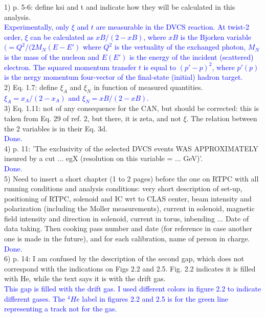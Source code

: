 1) p. 5-6: define ksi and t and indicate how they will be calculated in this 
analysis.\\
   \textcolor{blue}{ Experimentally, only  $\xi$ and $t$ are 
      measurable in the DVCS reaction. At twist-2 order, $\xi$ can be 
      calculated as $xB/(2-xB)$, where $xB$ is the Bjorken variable $(= 
      Q^{2}/(2M_{N}(E-E')$ where $Q^2$ is the vertuality of the exchanged 
      photon, $M_{N}$ is the mass of the nucleon and $E (E')$ is the energy of 
      the incident (scattered) electron. The squared
 momentum transfer $t$  is equal to $(p'- p)^{2}$, where $p' (p)$ is the nergy 
 momentum four-vector of the final-state (initial) hadron target. }\\

2) Eq. 1.7: define $\xi_{A}$ and $\xi_{N}$ in function of measured quantities. \\
\textcolor{blue}{ $ \xi_{A}= x_{A}/(2-x_{A})$ and  $\xi_{N}= xB/(2-xB)$.
}\\

3) Eq. 1.11: not of any consequence for the CAN, but should be corrected:  this 
is taken from Eq. 29 of ref. 2, but there, it is zeta, and not $\xi$. The 
relation between the 2 variables is in their Eq. 3d. \\
\textcolor{blue}{   Done.}\\

4) p. 11: 'The exclusivity of the selected DVCS events WAS APPROXIMATELY 
insured by a cut ... egX (resolution on this variable = ... GeV)'. \\
\textcolor{blue}{Done.}\\


5) Need to insert a short chapter (1 to 2 pages) before the one on RTPC with all 
running conditions and analysis conditions: very short description of set-up, 
positioning of RTPC, solenoid and IC wrt to CLAS center, beam intensity and 
polarization (including the Moller measurements), current in solenoid, magnetic 
field intensity and direction in solenoid, current in torus, inbending ... Date 
of data taking. Then cooking pass number and date (for reference in case 
another one is made in the future), and for each calibration, name of person in 
charge.
\textcolor{blue}{Done.}\\


6) p. 14: I am confused by the description of the second gap, which does not 
correspond with the indications on Figs 2.2 and 2.5. Fig. 2.2 indicates it is 
filled with He, while the text says it is with the drift gas.\\
\textcolor{blue}{This gap is filled with the drift gas. I used different colors 
in figure 2.2 to indicate different gases. The $^{4}He$ label in figures 2.2 
and 2.5 is for the green line representing a track not for the gas. } \\


